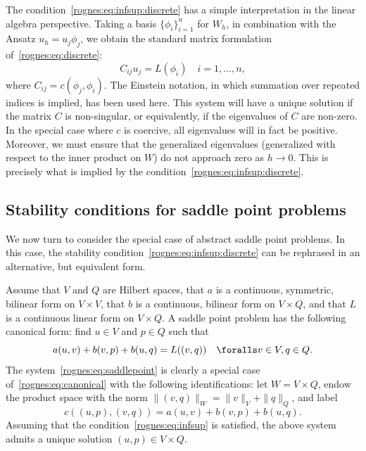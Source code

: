 The condition~\eqref{rognes:eq:infsup:discrete} has a simple
interpretation in the linear algebra perspective. Taking a basis
$\{\phi_i \}_{i=1}^n$ for $W_h$, in combination with the Ansatz
$u_h = u_j \phi_j$, we obtain the standard matrix formulation
of~\eqref{rognes:eq:discrete}:
\begin{equation}
  C_{ij} u_j = L(\phi_i) \quad i = 1, \dots, n,
\end{equation}
where $C_{ij} = c(\phi_j, \phi_i)$. The Einstein notation, in which
summation over repeated indices is implied, has been used here. This
system will have a unique solution if the matrix $C$ is non-singular,
or equivalently, if the eigenvalues of $C$ are non-zero. In the
special case where $c$ is coercive, all eigenvalues will in fact be
positive. Moreover, we must ensure that the generalized eigenvalues
(generalized with respect to the inner product on $W$) do not approach
zero as $h \rightarrow 0$. This is precisely what is implied by the
condition~\eqref{rognes:eq:infsup:discrete}.

\subsection{Stability conditions for saddle point problems}

We now turn to consider the special case of abstract saddle point
problems. In this case, the stability
condition~\eqref{rognes:eq:infsup:discrete} can be rephrased in an
alternative, but equivalent form.

Assume that $V$ and $Q$ are Hilbert spaces, that $a$ is a continuous,
symmetric, bilinear form on $V \times V$, that $b$ is a continuous,
bilinear form on $V \times Q$, and that $L$ is a continuous linear
form on $V \times Q$. A saddle point problem has the following
canonical form: find $u
\in V$ and $p \in Q$ such that
\begin{equation}
    \label{rognes:eq:saddlepoint}
    a(u, v) + b(v, p) + b(u, q) = L((v, q))
    \quad \foralls v \in V, q \in Q.
\end{equation}
The system~\eqref{rognes:eq:saddlepoint} is clearly a special case
of~\eqref{rognes:eq:canonical} with the following identifications: let
$W = V \times Q$, endow the product space with the norm $\|(v,
q)\|_{W} = \|v\|_{V} + \|q\|_{Q}$, and label
\begin{equation}
  c((u, p), (v, q)) = a(u, v) + b(v, p) + b(u, q).
\end{equation}
Assuming that the condition~\eqref{rognes:eq:infsup} is satisfied,
the above system admits a unique solution $(u, p) \in V \times Q$.

